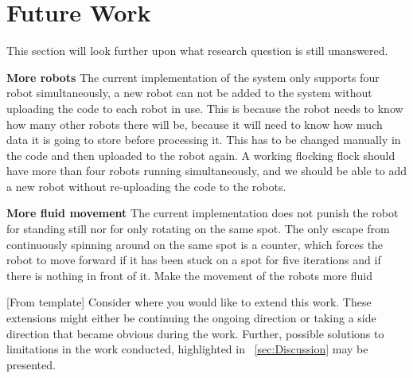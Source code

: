 \section{Future Work}
\label{sec:futureWork}

This section will look further upon what research question is still unanswered.

\textbf{More robots}
The current implementation of the system only supports four robot simultaneously, a new robot can not be added to the system without uploading the code to each robot in use. 
This is because the robot needs to know how many other robots there will be, because it will need to know how much data it is going to store before processing it. This has to be changed manually in the code and then uploaded to the robot again.
A working flocking flock should have more than four robots running simultaneously, and we should be able to add a new robot without re-uploading the code to the robots.

\textbf{More fluid movement}
The current implementation does not punish the robot for standing still nor for only rotating on the same spot. The only escape from continuously spinning around on the same spot is a counter, which forces the robot to move forward if it has been stuck on a spot for five iterations and if there is nothing in front of it. 
Make the movement of the robots more fluid

[From template] %
Consider where you would like to extend this work. These extensions might either be continuing the ongoing direction or taking a side direction that became obvious during the work. Further, possible solutions to limitations in the work conducted, highlighted in ~\ref{sec:Discussion} may be presented. 



